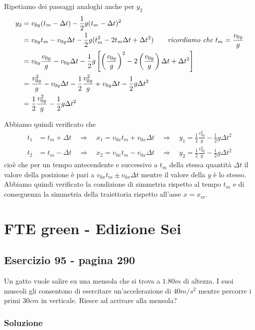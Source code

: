 \documentclass{article}
\begin{document}
Ripetiamo dei passaggi analoghi anche per $y_2$
\begin{align}
  y_2 &= v_{0y} (t_m - \Delta t) - \frac{1}{2}g(t_m - \Delta t)^2 \\
      &= v_{0y} t_m - v_{0y} \Delta t - \frac{1}{2}g (t_m^2 - 2 t_m \Delta t + \Delta t^2) \qquad \text{\textit{ricordiamo che $t_m = \frac{v_{0y}}{g}$}} \\
      &= v_{0y} \frac{v_{0y}}{g} - v_{0y} \Delta t - \frac{1}{2}g \left[\left(\frac{v_{0y}}{g}\right)^2 - 2 \left(\frac{v_{0y}}{g}\right) \Delta t + \Delta t^2\right] \\
      &= \frac{v_{0y}^2}{g} - v_{0y} \Delta t - \frac{1}{2} \frac{v_{0y}^2}{g} + v_{0y} \Delta t - \frac{1}{2}g \Delta t ^2 \\
      &= \frac{1}{2} \frac{v_{0y}^2}{g} - \frac{1}{2}g \Delta t ^2
\end{align}

Abbiamo quindi verificato che
\begin{align}
  t_1 &= t_m + \Delta t 
  \quad \Rightarrow \quad x_1 = v_{0x} t_m + v_{0x} \Delta t
  \quad \Rightarrow \quad y_1 = \frac{1}{2} \frac{v_{0y}^2}{g} - \frac{1}{2}g \Delta t ^2 \\
  t_2 &= t_m - \Delta t 
  \quad \Rightarrow \quad x_2 = v_{0x} t_m - v_{0x} \Delta t
  \quad \Rightarrow \quad y_2 = \frac{1}{2} \frac{v_{0y}^2}{g} - \frac{1}{2}g \Delta t ^2
\end{align}
cioè che per un tempo antecendente e successivo a $t_m$ della stessa quantità $\Delta t$ il valore della posizione è pari a $v_{0x}t_m \pm v_{0x} \Delta t$ mentre il valore della $y$ è lo stesso. Abbiamo quindi verificato la condizione di simmetria rispetto al tempo $t_m$ e di conseguenza la simmetria della traiettoria rispetto all'asse $x=x_m$. 

\newpage
\section{FTE green - Edizione Sei}
\subsection{Esercizio 95 - pagina 290}
Un gatto vuole salire su una mensola che si trova a $1.80m$ di altezza. I suoi muscoli gli consentono di esercitare un'accelerazione di $40m/s^2$ mentre percorre i primi $30cm$ in verticale. Riesce ad arrivare alla mensola?

\subsubsection{Soluzione}
\end{document}
